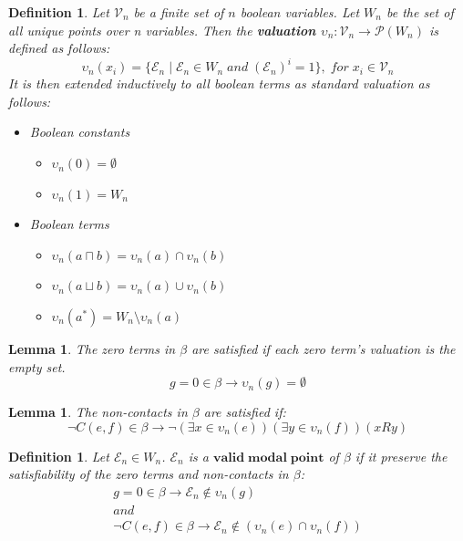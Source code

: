 \documentclass{article}
\newcommand\p{\mathcal{P}}
\newcommand\V{\mathcal{V}}
\newcommand\E{\mathcal{E}}
\newtheorem{lemma}[theorem]{Lemma}
\newtheorem{defn}[theorem]{Definition}
\begin{document}
		\begin{defn}
			\label{valuation-modal-points}
			Let $\V_n$ be a finite set of $n$ boolean variables. Let $W_n$ be the set of all unique points over n variables. Then the \textbf{valuation $\upsilon_n : \V_n \rightarrow \p(W_n)$} is defined as follows:
		\begin{equation}
			\upsilon_n(x_i) = \{ \E_n \mid \E_n \in W_n \; and \; (\E_n)^i = 1 \}, \; for \; x_i \in \V_n
		\end{equation}
			It is then extended inductively to all boolean terms as standard valuation as follows:
			\begin{itemize}
				\item Boolean constants
					\begin{itemize}
						\item $\upsilon_n(0) = \emptyset$
						\item $\upsilon_n(1) = W_n$
					\end{itemize}
				\item Boolean terms
					\begin{itemize}
						\item $\upsilon_n(a \sqcap b) = \upsilon_n(a) \cap \upsilon_n(b)$
						\item $\upsilon_n(a \sqcup b) = \upsilon_n(a) \cup \upsilon_n(b)$
						\item $\upsilon_n(a^*) = W_n \setminus \upsilon_n(a)$
					\end{itemize}
			\end{itemize}
		\end{defn}

		\begin{lemma}
			The zero terms in $\beta$ are satisfied if each zero term's valuation is the empty set.
			\begin{equation}
				g = 0 \in \beta \rightarrow \upsilon_n(g) = \emptyset
			\end{equation}
		\end{lemma}

		\begin{lemma}
			The non-contacts in $\beta$ are satisfied if:
			\begin{equation}
				\neg C(e, f) \in \beta \rightarrow \neg(\exists x \in \upsilon_n(e))(\exists y \in \upsilon_n(f))(xRy)
			\end{equation}
		\end{lemma}

		\begin{defn}
			Let $\E_n \in W_n$. $\E_n$ is a $\mathbf{valid \; modal \; point}$ of $\beta$ if it preserve the satisfiability of the zero terms and non-contacts in $\beta$:
			\begin{gather*}
				g = 0 \in \beta \rightarrow \E_n \notin \upsilon_n(g) \\ and \\
				\neg C(e, f) \in \beta \rightarrow \E_n \notin (\upsilon_n(e) \cap \upsilon_n(f))
			\end{gather*}
		\end{defn}
\end{document}
